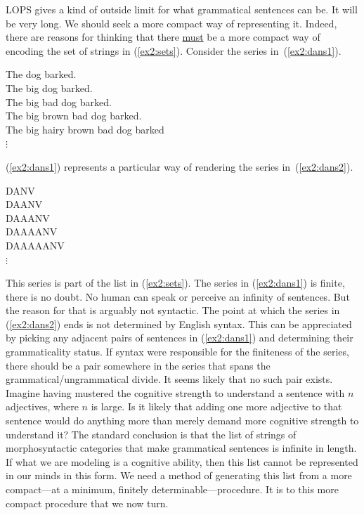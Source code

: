 LOPS gives a kind of outside limit for what grammatical sentences can be. It will be very long. We should seek a more compact way of representing it. Indeed, there are reasons for thinking that there \underline{must} be a more compact way of encoding the set of strings in (\ref{ex2:sets}). Consider the series in~(\ref{ex2:dans1}).
\begin{exe}
	\raggedright
	\ex \label{ex2:dans1} 
	The dog barked.\\ The big dog barked.\\ The big bad dog barked.\\ The big brown bad dog barked.\\ The big hairy brown bad dog barked\\ \hspace*{1in}$\vdots$
\end{exe}
(\ref{ex2:dans1}) represents a particular way of rendering the series in~(\ref{ex2:dans2}).
\begin{exe}
	\raggedright
	\ex \label{ex2:dans2} 
	DANV\\ DAANV\\ DAAANV\\ DAAAANV\\ DAAAAANV\\ \hspace*{.25in}$\vdots$
\end{exe}
This series is part of the list in (\ref{ex2:sets}). The series in (\ref{ex2:dans1}) is finite, there is no doubt. No human can speak or perceive an infinity of sentences. But the reason for that is arguably not syntactic. The point at which the series in (\ref{ex2:dans2}) ends is not determined by English syntax. This can be appreciated by picking any adjacent pairs of sentences in (\ref{ex2:dans1}) and determining their grammaticality status. If syntax were responsible for the finiteness of the series, there should be a pair somewhere in the series that spans the grammatical/ungrammatical divide. It seems likely that no such pair exists. Imagine having mustered the cognitive strength to understand a sentence with $n$ adjectives, where $n$ is large. Is it likely that adding one more adjective to that sentence would do anything more than merely demand more cognitive strength to understand it? The standard conclusion is that the list of strings of morphosyntactic categories that make grammatical sentences is infinite in length. If what we are modeling is a cognitive ability, then this list cannot be represented in our minds in this form. We need a method of generating this list from a more compact---at a minimum, finitely determinable---procedure. It is to this more compact procedure that we now turn.

